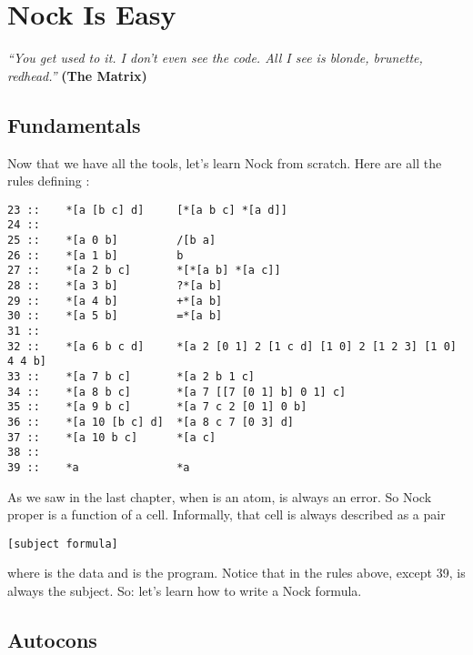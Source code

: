 \chapter{Nock Is Easy}

\emph{``You get used to it. I don’t even see the code. All I see is blonde, brunette, redhead.''}
\textbf{(The Matrix)}

\section{Fundamentals}

Now that we have all the tools, let's learn Nock from scratch.
Here are all the rules defining \kode{*}:

\begin{framed_shaded}
\begin{Verbatim}[fontsize=\relsize{-2.5},fontseries=b,commandchars=\\\{\}]
23 ::    *[a [b c] d]     [*[a b c] *[a d]]
24 ::
25 ::    *[a 0 b]         /[b a]
26 ::    *[a 1 b]         b
27 ::    *[a 2 b c]       *[*[a b] *[a c]]
28 ::    *[a 3 b]         ?*[a b]
29 ::    *[a 4 b]         +*[a b]
30 ::    *[a 5 b]         =*[a b]
31 ::
32 ::    *[a 6 b c d]     *[a 2 [0 1] 2 [1 c d] [1 0] 2 [1 2 3] [1 0] 4 4 b]
33 ::    *[a 7 b c]       *[a 2 b 1 c]
34 ::    *[a 8 b c]       *[a 7 [[7 [0 1] b] 0 1] c]
35 ::    *[a 9 b c]       *[a 7 c 2 [0 1] 0 b]
36 ::    *[a 10 [b c] d]  *[a 8 c 7 [0 3] d]
37 ::    *[a 10 b c]      *[a c]
38 ::
39 ::    *a               *a
\end{Verbatim}
\end{framed_shaded}
As we saw in the last chapter, when  is an atom,  is
always an error.  So Nock proper is a function of a cell.
Informally, that cell is always described as a pair

\begin{framed_shaded}
\begin{Verbatim}[fontsize=\relsize{-2.5},fontseries=b,commandchars=\\\{\}]
[subject formula]
\end{Verbatim}
\end{framed_shaded}
where  is the data and  is the program.  Notice
that  in the rules above, except 39, is always the subject.
So: let's learn how to write a Nock formula.

\section{Autocons}

